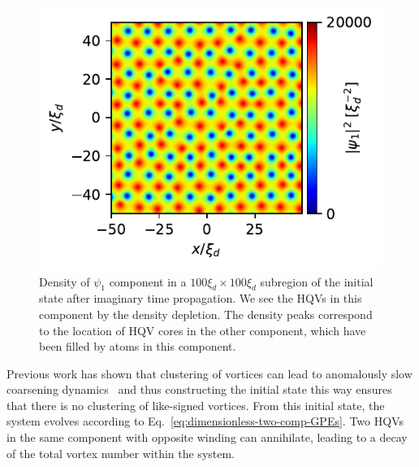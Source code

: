 \begin{figure}
    \centering
    \includegraphics{gfx/ch-twoCompDynamics/init_state.pdf}
    \caption{Density of $\psi_1$ component in a $100\xi_d\times100\xi_d$
    subregion of the initial state after imaginary time propagation.
    We see the HQVs in this component by the density depletion.
    The density peaks correspond to the location of HQV cores in the other
    component, which have been filled by atoms in this component.}
    \label{fig:initial-vortex-state}
\end{figure}
Previous work has shown that clustering of vortices can lead to anomalously
slow coarsening dynamics~\cite{Karl2017} and thus constructing the initial
state this way ensures that there is no clustering of like-signed vortices.
From this initial state, the system evolves according to
Eq.~\eqref{eq:dimensionless-two-comp-GPEs}.
Two HQVs in the same component with opposite winding can annihilate, leading to
a decay of the total vortex number within the system.

